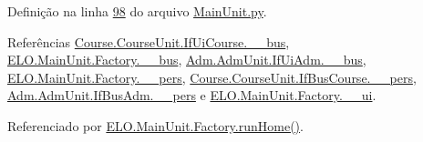 Definição na linha \hyperlink{MainUnit_8py_source_l00098}{98} do arquivo \hyperlink{MainUnit_8py_source}{Main\-Unit.\-py}.



Referências \hyperlink{CourseUnit_8py_source_l00027}{Course.\-Course\-Unit.\-If\-Ui\-Course.\-\_\-\-\_\-bus}, \hyperlink{MainUnit_8py_source_l00039}{E\-L\-O.\-Main\-Unit.\-Factory.\-\_\-\-\_\-bus}, \hyperlink{AdmUnit_8py_source_l00067}{Adm.\-Adm\-Unit.\-If\-Ui\-Adm.\-\_\-\-\_\-bus}, \hyperlink{MainUnit_8py_source_l00040}{E\-L\-O.\-Main\-Unit.\-Factory.\-\_\-\-\_\-pers}, \hyperlink{CourseUnit_8py_source_l00056}{Course.\-Course\-Unit.\-If\-Bus\-Course.\-\_\-\-\_\-pers}, \hyperlink{AdmUnit_8py_source_l00112}{Adm.\-Adm\-Unit.\-If\-Bus\-Adm.\-\_\-\-\_\-pers} e \hyperlink{MainUnit_8py_source_l00038}{E\-L\-O.\-Main\-Unit.\-Factory.\-\_\-\-\_\-ui}.



Referenciado por \hyperlink{classELO_1_1MainUnit_1_1Factory_a766943202ba781821cf749ca0fb133ba}{E\-L\-O.\-Main\-Unit.\-Factory.\-run\-Home()}.


